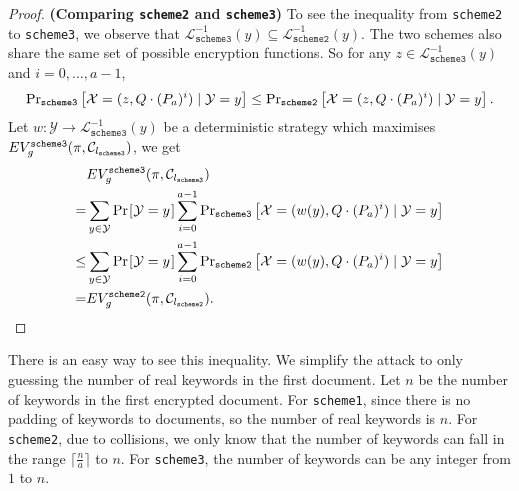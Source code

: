 \begin{proof}
\textbf{(Comparing \texttt{scheme2} and \texttt{scheme3})} To see the inequality from \texttt{scheme2} to \texttt{scheme3}, we observe that $\mathcal{L}_\texttt{scheme3}^{-1}(y) \subseteq \mathcal{L}_\texttt{scheme2}^{-1}(y)$. The two schemes also share the same set of possible encryption functions. So for any $z \in \mathcal{L}_\texttt{scheme3}^{-1}(y)$ and $i = 0, \dots, a-1$, 
\begin{align*}
\text{Pr}_{\texttt{scheme3}}\left[\mathcal{X} = (z, Q \cdot (P_a)^i) \mid \mathcal{Y} = y\right] \leq \text{Pr}_{\texttt{scheme2}}\left[\mathcal{X} = (z, Q \cdot (P_a)^i) \mid \mathcal{Y} = y\right].
\end{align*} 
Let $w: \mathcal{Y} \rightarrow \mathcal{L}_\texttt{scheme3}^{-1}(y)$ be a deterministic strategy which maximises $EV_g^{\texttt{scheme3}}(\pi, \mathcal{C}_{l_\texttt{scheme3}})$, we get
\begin{align*}
  &EV_g^{\texttt{scheme3}}(\pi, \channel_{\leak_\texttt{scheme3}})\\
= &\sum_{y \in {\mathcal{Y}}} \prob{\mathcal{Y} = y} \sum_{i = 0}^{a-1} \text{Pr}_{\texttt{scheme3}}\left[\mathcal{X} = (w(y), Q \cdot (\perm_a)^i) \mid \mathcal{Y} = y\right] \\
\leq &\sum_{y \in {\mathcal{Y}}} \prob{\mathcal{Y} = y} \sum_{i = 0}^{a-1} \text{Pr}_{\texttt{scheme2}}\left[\mathcal{X} = (w(y), Q \cdot (\perm_a)^i) \mid \mathcal{Y} = y\right] \\
= &EV_g^{\texttt{scheme2}}(\pi, \channel_{\leak_\texttt{scheme2}}).
\end{align*}
\end{proof}

There is an easy way to see this inequality. We simplify the attack to only guessing the number of real keywords in the first document. Let $n$ be the number of keywords in the first encrypted document. For \texttt{scheme1}, since there is no padding of keywords to documents, so the number of real keywords is $n$. For \texttt{scheme2}, due to collisions, we only know that the number of keywords can fall in the range $\lceil \frac{n}{a} \rceil$ to $n$. For \texttt{scheme3}, the number of keywords can be any integer from $1$ to $n$.










